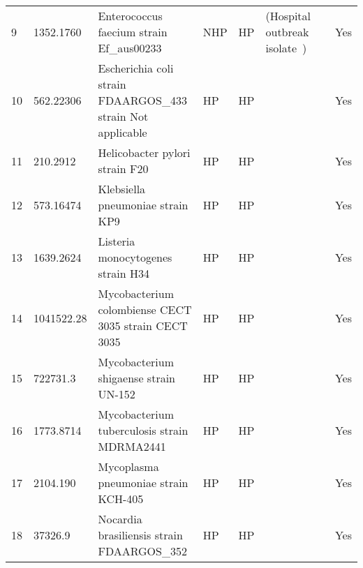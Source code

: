 \begin{tabular}{llllllll}
9   &   1352.1760 &                          Enterococcus faecium strain Ef\_aus00233 &           NHP &              HP &  (Hospital outbreak isolate~\cite{buultjens2017evolutionary}) &      \cite{zhou2020enterococcus} &           Yes \\
10  &   562.22306 &       Escherichia coli strain FDAARGOS\_433 strain Not applicable &            HP &              HP &                                              \cite{562.22306} &                                  &           Yes \\
11  &    210.2912 &                                    Helicobacter pylori strain F20 &            HP &              HP &                                   \cite{kojima2016population} &                                  &           Yes \\
12  &   573.16474 &                                  Klebsiella pneumoniae strain KP9 &            HP &              HP &                                              \cite{573.16474} &   \cite{chi2019characterization} &           Yes \\
13  &   1639.2624 &                                 Listeria monocytogenes strain H34 &            HP &              HP &                                      \cite{muchaamba2017full} &         \cite{muchaamba2017full} &           Yes \\
14  &  1041522.28 &              Mycobacterium colombiense CECT 3035 strain CECT 3035 &            HP &              HP &                                \cite{gonzalez2016deciphering} &   \cite{gonzalez2016deciphering} &           Yes \\
15  &    722731.3 &                             Mycobacterium shigaense strain UN-152 &            HP &              HP &                                \cite{fukano2018mycobacterium} &           \cite{fukano2020first} &           Yes \\
16  &   1773.8714 &                       Mycobacterium tuberculosis strain MDRMA2441 &            HP &              HP &                                      \cite{sheen2017multiple} &                                  &           Yes \\
17  &    2104.190 &                              Mycoplasma pneumoniae strain KCH-405 &            HP &              HP &                                      \cite{kenri2017complete} &                                  &           Yes \\
18  &     37326.9 &                        Nocardia brasiliensis strain FDAARGOS\_352 &            HP &              HP &                                                \cite{37326.9} &                                  &           Yes \\

\end{tabular}

